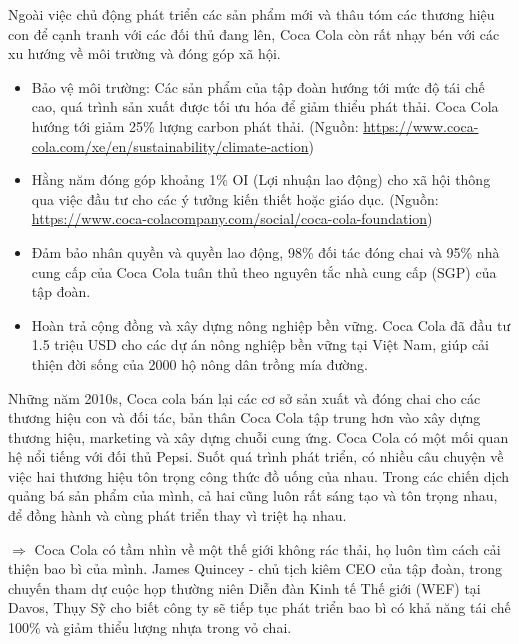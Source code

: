 \documentclass{article}
\begin{document}
    \vspace{0.2cm}
    Ngoài việc chủ động phát triển các sản phẩm mới và thâu tóm các thương hiệu con để cạnh tranh với các đối thủ đang lên, Coca Cola còn rất nhạy bén với các xu hướng về môi trường và đóng góp xã hội.
    \begin{itemize}
        \item Bảo vệ môi trường: Các sản phẩm của tập đoàn hướng tới mức độ tái chế cao, quá trình sản xuất được tối ưu hóa để giảm thiểu phát thải. Coca Cola hướng tới giảm 25\% lượng carbon phát thải. (Nguồn: \href{https://www.coca-cola.com/xe/en/sustainability/climate-action}{https://www.coca-cola.com/xe/en/sustainability/climate-action})
        \item Hằng năm đóng góp khoảng 1\% OI (Lợi nhuận lao động) cho xã hội thông qua việc đầu tư cho các ý tưởng kiến thiết hoặc giáo dục. (Nguồn: \href{https://www.coca-colacompany.com/social/coca-cola-foundation}{https://www.coca-colacompany.com/social/coca-cola-foundation})
        \item Đảm bảo nhân quyền và quyền lao động, 98\% đối tác đóng chai và 95\% nhà cung cấp của Coca Cola tuân thủ theo nguyên tắc nhà cung cấp (SGP) của tập đoàn.
        \item Hoàn trả cộng đồng và xây dựng nông nghiệp bền vững. Coca Cola đã đầu tư 1.5 triệu USD cho các dự án nông nghiệp bền vững tại Việt Nam, giúp cải thiện đời sống của 2000 hộ nông dân trồng mía đường.
    \end{itemize}

    \vspace{0.2cm}
    Những năm 2010s, Coca cola bán lại các cơ sở sản xuất và đóng chai cho các thương hiệu con và đối tác, bản thân Coca Cola tập trung hơn vào xây dựng thương hiệu, marketing và xây dựng chuỗi cung ứng. Coca Cola có một mối quan hệ nổi tiếng với đối thủ Pepsi. Suốt quá trình phát triển, có nhiều câu chuyện về việc hai thương hiệu tôn trọng công thức đồ uống của nhau. Trong các chiến dịch quảng bá sản phẩm của mình, cả hai cũng luôn rất sáng tạo và tôn trọng nhau, để đồng hành và cùng phát triển thay vì triệt hạ nhau.

    \vspace{0.2cm}
    $\Rightarrow$ Coca Cola có tầm nhìn về một thế giới không rác thải, họ luôn tìm cách cải thiện bao bì của mình. James Quincey - chủ tịch kiêm CEO của tập đoàn, trong chuyến tham dự cuộc họp thường niên Diễn đàn Kinh tế Thế giới (WEF) tại Davos, Thụy Sỹ cho biết công ty sẽ tiếp tục phát triển bao bì có khả năng tái chế 100\% và giảm thiểu lượng nhựa trong vỏ chai.
\end{document}
